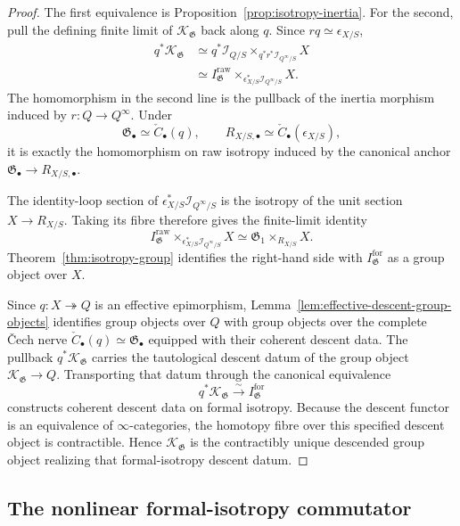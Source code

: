 \begin{proof}
The first equivalence is
Proposition~\ref{prop:isotropy-inertia}.  For the second, pull the defining
finite limit of $\mathcal K_{\mathfrak G}$ back along $q$.  Since
$r q\simeq\epsilon_{X/S}$,
\[
\begin{aligned}
    q^*\mathcal K_{\mathfrak G}
    &\simeq
    q^*\mathcal I_{Q/S}
    \times_{q^*r^*\mathcal I_{Q^\infty/S}}
    X\\
    &\simeq
    I^{\mathrm{raw}}_{\mathfrak G}
    \times_{\epsilon_{X/S}^*\mathcal I_{Q^\infty/S}}
    X.
\end{aligned}
\]
The homomorphism in the second line is the pullback of the inertia morphism
induced by $r:Q\to Q^\infty$.  Under
\[
    \mathfrak G_\bullet\simeq\check C_\bullet(q),
    \qquad
    R_{X/S,\bullet}\simeq\check C_\bullet(\epsilon_{X/S}),
\]
it is exactly the homomorphism on raw isotropy induced by the canonical anchor
$\mathfrak G_\bullet\to R_{X/S,\bullet}$.

The identity-loop section of
$\epsilon_{X/S}^*\mathcal I_{Q^\infty/S}$ is the isotropy of the unit section
$X\to R_{X/S}$.  Taking its fibre therefore gives the finite-limit identity
\[
    I^{\mathrm{raw}}_{\mathfrak G}
    \times_{\epsilon_{X/S}^*\mathcal I_{Q^\infty/S}}
    X
    \simeq
    \mathfrak G_1\times_{R_{X/S}}X.
\]
Theorem~\ref{thm:isotropy-group} identifies the right-hand side with
$I^{\mathrm{for}}_{\mathfrak G}$ as a group object over $X$.

Since $q:X\twoheadrightarrow Q$ is an effective epimorphism,
Lemma~\ref{lem:effective-descent-group-objects} identifies group objects over
$Q$ with group objects over the complete \v{C}ech nerve
$\check C_\bullet(q)\simeq\mathfrak G_\bullet$ equipped with their coherent
descent data.  The pullback $q^*\mathcal K_{\mathfrak G}$ carries the
tautological descent datum of the group object
$\mathcal K_{\mathfrak G}\to Q$.  Transporting that datum through the
canonical equivalence
\[
    q^*\mathcal K_{\mathfrak G}
    \xrightarrow{\sim}
    I^{\mathrm{for}}_{\mathfrak G}
\]
constructs coherent descent data on formal isotropy.  Because the descent
functor is an equivalence of $\infty$-categories, the homotopy fibre over this
specified descent object is contractible.  Hence
$\mathcal K_{\mathfrak G}$ is the contractibly unique descended group object
realizing that formal-isotropy descent datum.
\end{proof}

\subsection{The nonlinear formal-isotropy commutator}

